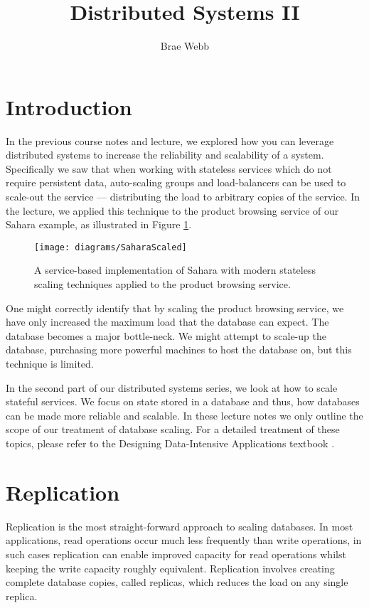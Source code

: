 \title{Distributed Systems II}
\author{Brae Webb}
\date{}

\maketitle

\section{Introduction}
In the previous course notes and lecture,
we explored how you can leverage distributed systems to increase the reliability and scalability of a system.
Specifically we saw that when working with stateless services which do not require persistent data,
auto-scaling groups and load-balancers can be used to scale-out the service --- distributing the load to arbitrary copies of the service.
In the lecture, we applied this technique to the product browsing service of our Sahara example,
as illustrated in Figure \ref{fig:scaled-sahara}.

\begin{figure}[H]
\begin{center}
\texttt{[image: diagrams/SaharaScaled]}
\end{center}
\caption{A service-based implementation of Sahara with modern stateless scaling techniques applied to the product browsing service.}
\label{fig:scaled-sahara}
\end{figure}

One might correctly identify that by scaling the product browsing service,
we have only increased the maximum load that the database can expect.
The database becomes a major bottle-neck.
We might attempt to scale-up the database,
purchasing more powerful machines to host the database on,
but this technique is limited.

In the second part of our distributed systems series,
we look at how to scale stateful services.
We focus on state stored in a database and thus,
how databases can be made more reliable and scalable.
In these lecture notes we only outline the scope of our treatment of database scaling.
For a detailed treatment of these topics,
please refer to the Designing Data-Intensive Applications textbook \cite{data-intensive}.

\section{Replication}
Replication is the most straight-forward approach to scaling databases.
In most applications,
read operations occur much less frequently than write operations,
in such cases replication can enable improved capacity for read operations whilst keeping the write capacity roughly equivalent.
Replication involves creating complete database copies,
called replicas, which reduces the load on any single replica.

